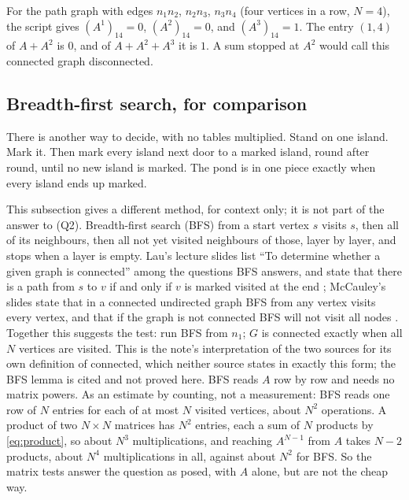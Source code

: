 \begin{example}\label{ex:early}
For the path graph with edges $n_1n_2$, $n_2n_3$, $n_3n_4$ (four vertices in a
row, $N=4$), the
script gives $(A^1)_{14}=0$, $(A^2)_{14}=0$, and $(A^3)_{14}=1$. The entry
$(1,4)$ of $A+A^2$ is $0$, and of $A+A^2+A^3$ it is $1$. A sum stopped at
$A^2$ would call this connected graph disconnected.
\end{example}

\subsection{Breadth-first search, for comparison}

\plainwords{} There is another way to decide, with no tables multiplied.
Stand on one island. Mark it. Then mark every island next door to a marked
island, round after round, until no new island is marked. The pond is in
one piece exactly when every island ends up marked.

This subsection gives a different method, for context only; it is not part
of the answer to (Q2). Breadth-first search (BFS) from a start vertex $s$ visits $s$, then all of
its neighbours, then all not yet visited neighbours of those, layer by
layer, and stops when a layer is empty. Lau's lecture slides list ``To
determine whether a given graph is connected'' among the questions BFS
answers, and state that there is a path from $s$ to $v$ if and only if $v$
is marked visited at the end \cite[pp.~4, 8]{lau2021bfs}; McCauley's
slides state that in a connected undirected graph BFS from any vertex
visits every vertex, and that if the graph is not connected BFS will not
visit all nodes \cite[pp.~10, 7]{mccauley2025bfs}. Together this
suggests the test: run BFS from $n_1$; $G$ is connected exactly when all
$N$ vertices are visited. This is the note's interpretation of the two
sources for its own definition of connected, which neither source states
in exactly this form; the BFS lemma is cited and not proved here. BFS reads
$A$ row by row and needs no matrix powers. As an estimate by counting, not
a measurement: BFS reads one row of $N$ entries for each of at most $N$
visited vertices, about $N^2$ operations. A product of two $N\times N$
matrices has $N^2$ entries, each a sum of $N$ products by \cref{eq:product},
so about $N^3$ multiplications, and reaching $A^{N-1}$ from $A$ takes $N-2$
products, about $N^4$ multiplications in all, against about $N^2$ for BFS. So the matrix tests answer the question as posed, with $A$ alone,
but are not the cheap way.
